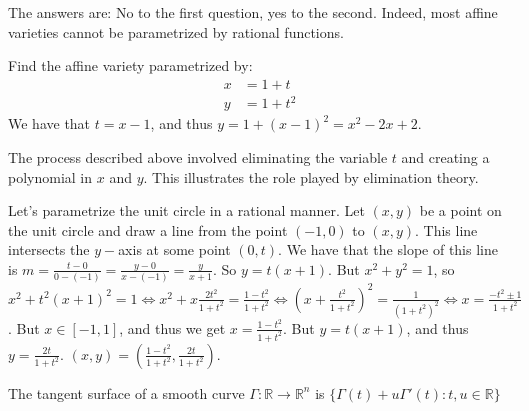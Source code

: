                 The answers are: No to the first question,
                yes to the second. Indeed, most affine varieties
                cannot be parametrized by rational functions.
                \begin{example}
                    Find the affine variety parametrized by:
                    \begin{align*}
                        x&=1+t\\
                        y&=1+t^{2}
                    \end{align*}
                    We have that $t=x-1$, and thus
                    $y=1+(x-1)^{2}=x^{2}-2x+2$.
                \end{example}
                \begin{remark}
                    The process described above involved
                    eliminating the variable $t$ and creating
                    a polynomial in $x$ and $y$. This illustrates
                    the role played by elimination theory.
                \end{remark}
                \begin{example}
                    Let's parametrize the unit circle in a
                    rational manner. Let $(x,y)$ be a point on
                    the unit circle and draw a line from the
                    point $(-1,0)$ to $(x,y)$. This line intersects
                    the $y-$axis at some point $(0,t)$. We have
                    that the slope of this line is
                    $m=\frac{t-0}{0-(-1)}%
                     =\frac{y-0}{x-(-1)}=\frac{y}{x+1}$.
                    So $y=t(x+1)$. But $x^{2}+y^{2}=1$,
                    so
                    $x^2+t^{2}(x+1)^{2}%
                     =1\Leftrightarrow x^{2}+x\frac{2t^{2}}{1+t^{2}}%
                     =\frac{1-t^2}{1+t^2}%
                     \Leftrightarrow(x+\frac{t^{2}}{1+t^{2}})^{2}%
                     =\frac{1}{(1+t^{2})^{2}}%
                     \Leftrightarrow x=\frac{-t^{2}\pm 1}{1+t^{2}}$.
                    But $x\in [-1,1]$, and thus we get
                    $x=\frac{1-t^2}{1+t^2}$.
                    But $y=t(x+1)$, and thus
                    $y=\frac{2t}{1+t^2}$.
                    $(x,y)=(\frac{1-t^{2}}{1+t^{2}},\frac{2t}{1+t^{2}})$.
                \end{example}
                \begin{definition}
                    The tangent surface of a smooth curve
                    $\Gamma:\mathbb{R}\rightarrow\mathbb{R}^n$
                    is $\{\Gamma(t)+u\Gamma'(t):t,u\in \mathbb{R}\}$
                \end{definition}
